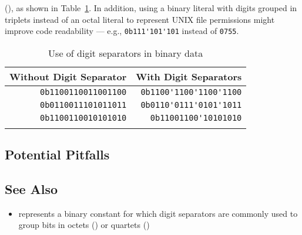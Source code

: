 (), as shown in Table~\ref{digitseparator-table2}. In addition, using a binary literal with digits grouped in triplets instead of an octal literal to represent UNIX file permissions might improve code readability --- e.g., \lstinline!0b111'101'101! instead of \lstinline!0755!.\begin{table}[h!]
\begin{center}
\begin{threeparttable}
\caption{Use of digit separators in binary data}\label{digitseparator-table2}\vspace{1.5ex}
{\small \begin{tabular}{c|c}
\thickhline
\rowcolor[gray]{.9} {\sffamily\bfseries Without Digit Separator} & {\sffamily\bfseries With Digit Separators} \\\hline
\multicolumn{1}{r|}{\lstinline!0b1100110011001100!} & \multicolumn{1}{r}{\lstinline!0b1100'1100'1100'1100!} \\ \hline
\multicolumn{1}{r|}{\lstinline!0b0110011101011011!} & \multicolumn{1}{r}{\lstinline!0b0110'0111'0101'1011!} \\ \hline
\multicolumn{1}{r|}{\lstinline!0b1100110010101010!} & \multicolumn{1}{r}{\lstinline!0b11001100'10101010!} \\
\thickhline
\end{tabular}
} %
\end{threeparttable}
\end{center}
\end{table}

\newpage%
\subsection[Potential Pitfalls]{Potential Pitfalls}\label{potential-pitfalls}

\hspace{\fill}

\subsection[See Also]{See Also}\label{see-also}

\begin{itemize}
\item{represents a binary constant for which digit separators are commonly used to group bits in octets () or quartets ()}
\end{itemize}


